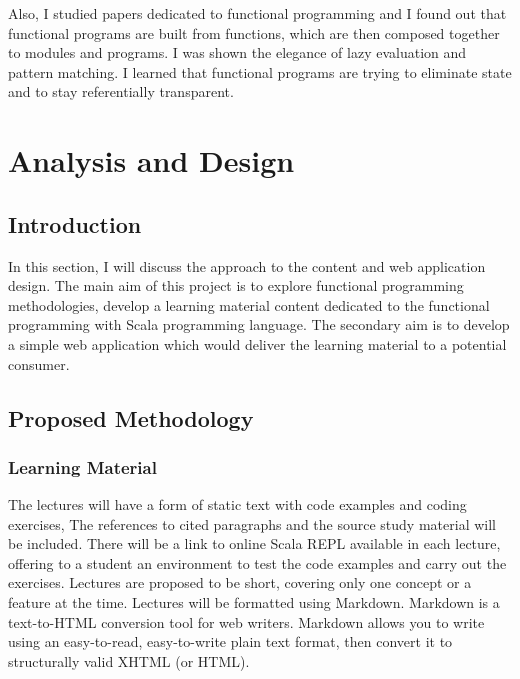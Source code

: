 \documentclass[12pt,twoside,a4paper]{report}
\begin{document}
Also, I studied papers dedicated to functional programming and I found out that functional programs are built from functions, which are then composed together to modules and programs. I was shown the elegance of lazy evaluation and pattern matching. I learned that functional programs are trying to eliminate state and to stay referentially transparent.










\chapter{Analysis and Design}\label{3}

\section{Introduction}\label{3.1}
In this section, I will discuss the approach to the content and web application design. The main aim of this project is to explore functional programming methodologies, develop a learning material content dedicated to the functional programming with Scala programming language. The secondary aim is to develop a simple web application which would deliver the learning material to a potential consumer. 

\section{Proposed Methodology}\label{3.2}

\subsection{Learning Material}\label{3.2.1}
The lectures will have a form of static text with code examples and coding exercises, The references to cited paragraphs and the source study material will be included. There will be a link to online Scala REPL\cite{18} available in each lecture, offering to a student an environment to test the code examples and carry out the exercises. Lectures are proposed to be short, covering only one concept or a feature at the time. Lectures will be formatted using Markdown. Markdown is a text-to-HTML conversion tool for web writers. Markdown allows you to write using an easy-to-read, easy-to-write plain text format, then convert it to structurally valid XHTML (or HTML)\cite{20}.
\end{document}
